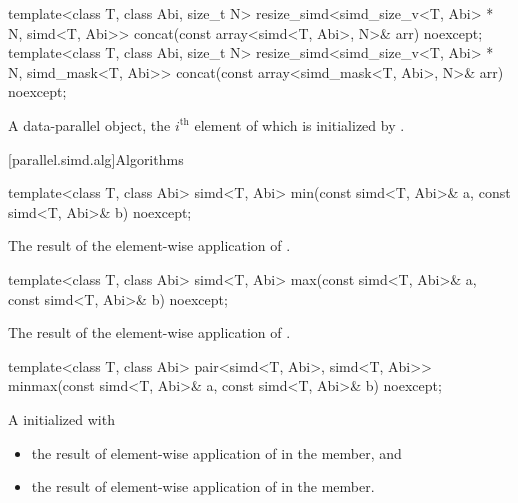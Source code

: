 \begin{itemdecl}
  template<class T, class Abi, size_t N>
    resize_simd<simd_size_v<T, Abi> * N, simd<T, Abi>>
      concat(const array<simd<T, Abi>, N>& arr) noexcept;
  template<class T, class Abi, size_t N>
    resize_simd<simd_size_v<T, Abi> * N, simd_mask<T, Abi>>
      concat(const array<simd_mask<T, Abi>, N>& arr) noexcept;
\end{itemdecl}

\begin{itemdescr}
  \pnum\returns
  A data-parallel object, the $i^\text{th}$ element of which is initialized by .
\end{itemdescr}

[parallel.simd.alg]{Algorithms}

\begin{itemdecl}
template<class T, class Abi> simd<T, Abi> min(const simd<T, Abi>& a, const simd<T, Abi>& b) noexcept;
\end{itemdecl}

\begin{itemdescr}
  \pnum\returns
  The result of the element-wise application of  \foralli.
\end{itemdescr}

\begin{itemdecl}
template<class T, class Abi> simd<T, Abi> max(const simd<T, Abi>& a, const simd<T, Abi>& b) noexcept;
\end{itemdecl}

\begin{itemdescr}
  \pnum\returns
  The result of the element-wise application of  \foralli.
\end{itemdescr}

\begin{itemdecl}
template<class T, class Abi>
  pair<simd<T, Abi>, simd<T, Abi>> minmax(const simd<T, Abi>& a, const simd<T, Abi>& b) noexcept;
\end{itemdecl}

\begin{itemdescr}
  \pnum\returns
  A  initialized with
  \begin{itemize}
    \item the result of element-wise application of  \foralli{} in the  member, and
    \item the result of element-wise application of  \foralli{} in the  member.
  \end{itemize}
\end{itemdescr}

